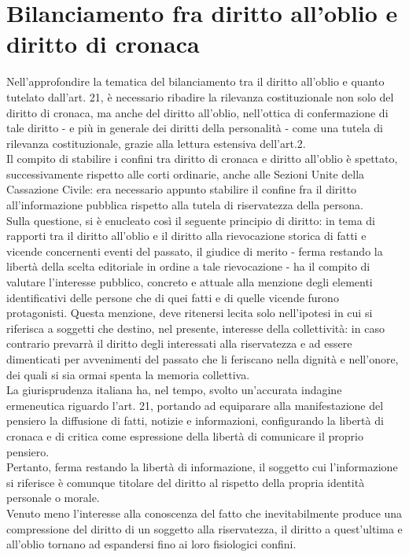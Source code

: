 \section{Bilanciamento fra diritto all'oblio e diritto di cronaca}
Nell'approfondire la tematica del bilanciamento tra il diritto all'oblio e quanto tutelato dall'art. 21, è necessario ribadire la rilevanza costituzionale non solo del diritto di cronaca, ma anche del diritto all'oblio, nell'ottica di confermazione di tale diritto - e più in generale dei diritti della personalità - come una tutela di rilevanza costituzionale, grazie alla lettura estensiva dell'art.2.
\\Il compito di stabilire i confini tra diritto di cronaca e diritto all'oblio è spettato, successivamente rispetto alle corti ordinarie, anche alle Sezioni Unite della Cassazione Civile: era necessario appunto stabilire il confine fra il diritto all'informazione pubblica rispetto alla tutela di riservatezza della persona.
\\Sulla questione, si è enucleato così il seguente principio di diritto: in tema di rapporti  tra il diritto all'oblio e il diritto alla rievocazione storica di fatti e vicende concernenti eventi del passato, il giudice di merito - ferma restando la libertà della scelta editoriale in ordine a tale rievocazione - ha il compito di valutare l'interesse pubblico, concreto e attuale alla menzione degli elementi identificativi delle persone che di quei fatti e di quelle vicende furono protagonisti.
Questa menzione, deve ritenersi lecita solo nell'ipotesi in cui si riferisca a soggetti che destino, nel presente, interesse della collettività: in caso contrario prevarrà il diritto degli interessati alla riservatezza e ad essere dimenticati per avvenimenti del passato che li feriscano nella dignità e nell'onore, dei quali si sia ormai spenta la memoria collettiva.
\\La giurisprudenza italiana ha, nel tempo, svolto un'accurata indagine ermeneutica riguardo l'art. 21, portando ad equiparare alla manifestazione del pensiero la diffusione di fatti, notizie e informazioni, configurando la libertà di cronaca e di critica come espressione della libertà di comunicare il proprio pensiero.
\\Pertanto, ferma restando la libertà di informazione, il soggetto cui l'informazione si riferisce è comunque titolare del diritto al rispetto della propria identità personale o morale. 
\\Venuto meno l'interesse alla conoscenza del fatto che inevitabilmente produce una compressione del diritto di un soggetto alla riservatezza, il diritto a quest'ultima e all'oblio tornano ad espandersi fino ai loro fisiologici confini.


